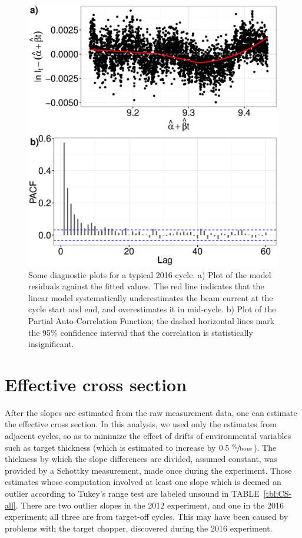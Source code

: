 \documentclass[reprint, superscriptaddress]{revtex4-1}
\newcommand{\scl}{.45}
\begin{document}
\begin{figure}
\centering
\includegraphics[scale=\scl]{img/DiagPlot_969.eps}
\caption{Some diagnostic plots for a typical 2016 cycle. a) Plot of the model residuals against the fitted values. The red line indicates that the linear model systematically underestimates the beam current at the cycle start and end, and overestimates it in mid-cycle. b) Plot of the Partial Auto-Correlation Function; the dashed horizontal lines mark the 95\% confidence interval that the correlation is statistically insignificant.\label{fig:Run969}}
\end{figure}

\section{Effective cross section}
After the slopes are estimated from the raw measurement data, one can estimate the effective cross section. In this analysis, we used only the estimates from adjacent cycles, so as to minimize the effect of drifts of environmental variables such as target thickness (which is estimated to increase by $0.5~ \sfrac{\%}{\mathrm{hour}}$). The thickness by which the slope differences are divided, assumed constant, was provided by a Schottky measurement, made once during the experiment. Those estimates whose computation involved at least one slope which is deemed an outlier according to Tukey's range test are labeled unsound in TABLE~\ref{tbl:CS-all}. There are two outlier slopes in the 2012 experiment, and one in the 2016 experiment; all three are from target-off cycles. This may have been caused by problems with the target chopper, discovered during the 2016 experiment.
\end{document}
